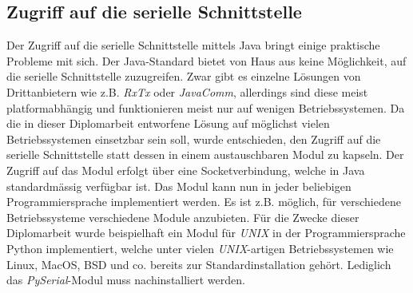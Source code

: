 \subsection{Zugriff auf die serielle Schnittstelle}
Der Zugriff auf die serielle Schnittstelle mittels Java bringt einige praktische Probleme mit sich.
Der Java-Standard bietet von Haus aus keine Möglichkeit, auf die serielle Schnittstelle zuzugreifen.
Zwar gibt es einzelne Lösungen von Drittanbietern wie z.B. \emph{RxTx} oder \emph{JavaComm}, allerdings
sind diese meist platformabhängig und funktionieren meist nur auf wenigen Betriebssystemen. Da die
in dieser Diplomarbeit entworfene Lösung auf möglichst vielen Betriebssystemen einsetzbar sein soll, 
wurde entschieden, den Zugriff auf die serielle Schnittstelle statt dessen in einem austauschbaren
Modul zu kapseln. Der Zugriff auf das Modul erfolgt über eine Socketverbindung, welche in Java
standardmässig verfügbar ist. Das Modul kann nun in jeder beliebigen Programmiersprache implementiert
werden. Es ist z.B. möglich, für verschiedene Betriebssysteme verschiedene Module anzubieten.
Für die Zwecke dieser Diplomarbeit wurde beispielhaft ein Modul für \emph{UNIX} in der Programmiersprache
Python implementiert, welche unter vielen \emph{UNIX}-artigen Betriebssystemen wie Linux, MacOS, BSD und co.
bereits zur Standardinstallation gehört. Lediglich das \emph{PySerial}-Modul muss nachinstalliert werden.

